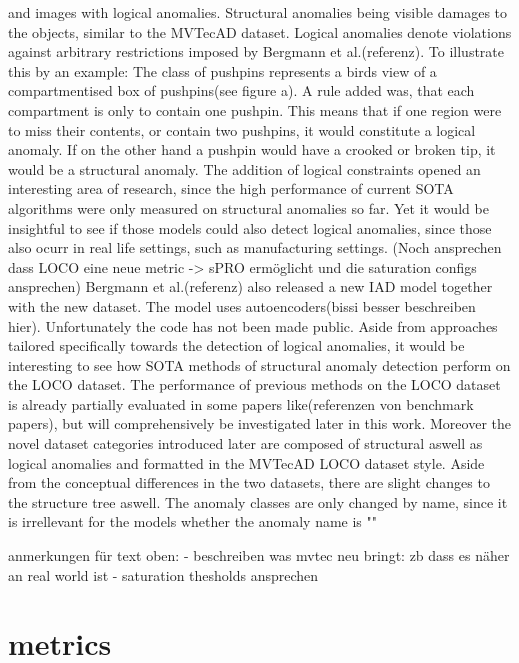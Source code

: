 and images with logical anomalies. Structural anomalies being visible damages to the objects, similar to the MVTecAD dataset. Logical anomalies denote violations against arbitrary restrictions 
imposed by Bergmann et al.(referenz). To illustrate this by an example: The class of pushpins represents a birds view of a compartmentised box of pushpins(see figure a). A rule added was, 
that each compartment is only to contain one pushpin. This means that if one region were to miss their contents, or contain two pushpins, it would constitute a logical anomaly. If on the 
other hand a pushpin would have a crooked or broken tip, it would be a structural anomaly. The addition of logical constraints opened an interesting area of research, since the high performance 
of current SOTA algorithms were only measured on structural anomalies so far. Yet it would be insightful to see if those models could also detect logical anomalies, since those also ocurr 
in real life settings, such as manufacturing settings. (Noch ansprechen dass LOCO eine neue metric -> sPRO ermöglicht und die saturation configs ansprechen)
Bergmann et al.(referenz) also released a new IAD model together with the new dataset. The model uses autoencoders(bissi besser beschreiben hier). Unfortunately the code has not been made public. 
Aside from approaches tailored specifically towards the detection of logical anomalies, it would be interesting to see how SOTA methods of structural anomaly detection perform on the LOCO dataset. 
The performance of previous methods on the LOCO dataset is already partially evaluated in some papers like(referenzen von benchmark papers), but will comprehensively be investigated later in this work.
Moreover the novel dataset categories introduced later are composed of structural aswell as logical anomalies and formatted in the MVTecAD LOCO dataset style.
Aside from the conceptual differences in the two datasets, there are slight changes to the structure tree aswell. The anomaly classes are only changed by name, since it is irrellevant for 
the models whether the anomaly name is ""




anmerkungen für text oben:
- beschreiben was mvtec neu bringt: zb dass es näher an real world ist
- saturation thesholds ansprechen



\section{metrics}

